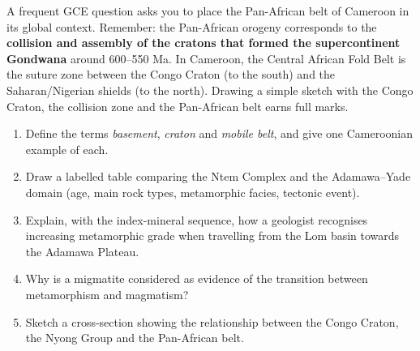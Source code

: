 \documentclass[11pt]{article}
\begin{document}
\begin{savaistu}
A frequent GCE question asks you to place the Pan-African belt of Cameroon in its global context. Remember: the Pan-African orogeny corresponds to the \textbf{collision and assembly of the cratons that formed the supercontinent Gondwana} around 600--550 Ma. In Cameroon, the Central African Fold Belt is the suture zone between the Congo Craton (to the south) and the Saharan/Nigerian shields (to the north). Drawing a simple sketch with the Congo Craton, the collision zone and the Pan-African belt earns full marks.
\end{savaistu}

\begin{exercice}
\begin{enumerate}
\item Define the terms \emph{basement}, \emph{craton} and \emph{mobile belt}, and give one Cameroonian example of each.
\item Draw a labelled table comparing the Ntem Complex and the Adamawa--Yade domain (age, main rock types, metamorphic facies, tectonic event).
\item Explain, with the index-mineral sequence, how a geologist recognises increasing metamorphic grade when travelling from the Lom basin towards the Adamawa Plateau.
\item Why is a migmatite considered as evidence of the transition between metamorphism and magmatism?
\item Sketch a cross-section showing the relationship between the Congo Craton, the Nyong Group and the Pan-African belt.
\end{enumerate}
\end{exercice}
\end{document}
